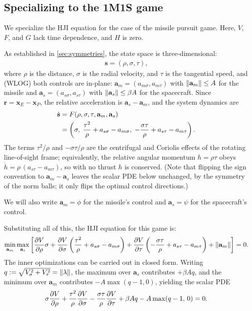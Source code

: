 \documentclass{article}
\newcommand{\eqdef}{:=}
\renewcommand{\vec}[1]{\mathbf{#1}}
\theoremstyle{remark}
\begin{document}
\subsection{Specializing to the 1M1S game}
\label{sec:reduction}

We specialize the HJI equation for the case of the missile pursuit game.
Here, $V$, $F$, and $G$ lack time dependence, and $H$ is zero.

As established in \cref{sec:symmetries}, the state space is three-dimensional:
\begin{align}
\vec{s} = (\rho, \sigma, \tau),
\end{align}
where $\rho$ is the distance, $\sigma$ is the radial velocity, and $\tau$ is the
tangential speed, and (WLOG) both controls are in-plane:
$\vec a_m = (a_{m\sigma}, a_{m\tau})$ with $\norm{\vec a_m} \le A$ for the
missile and $\vec a_s = (a_{s\sigma}, a_{s\tau})$ with
$\norm{\vec a_s} \le \beta A$ for the spacecraft.  Since $\vec r = \vec x_E -
\vec x_P$, the relative acceleration is $\vec a_s - \vec a_m$, and the system
dynamics are
\begin{align}
\dot{\vec{s}}
&= F(\rho, \sigma, \tau, \vec{a}_m, \vec{a}_s) \notag \\
&= \left(\sigma,\;
  \frac{\tau^2}{\rho} + a_{s\sigma} - a_{m\sigma},\;
  -\frac{\sigma\tau}{\rho} + a_{s\tau} - a_{m\tau}\right).
\end{align}
The terms $\tau^2/\rho$ and $-\sigma\tau/\rho$ are the centrifugal and
Coriolis effects of the rotating line-of-sight frame; equivalently, the
relative angular momentum $h = \rho\tau$ obeys
$\dot h = \rho\,(a_{s\tau} - a_{m\tau})$, so with no thrust $h$ is conserved.
(Note that flipping the sign convention to $\vec a_m - \vec a_s$ leaves the
scalar PDE below unchanged, by the symmetry of the norm balls; it only flips
the optimal control directions.)

We will also write $\vec{a}_m = \phi$ for the missile's control and $\vec{a}_s =
\psi$ for the spacecraft's control.

Substituting all of this, the HJI equation for this game is:
\begin{align}
\min_{\vec{a}_m} \max_{\vec{a}_s} \left[
  \pdv{V}{\rho} \sigma
+ \pdv{V}{\sigma} \left(\frac{\tau^2}{\rho} + a_{s\sigma} - a_{m\sigma}\right)
+ \pdv{V}{\tau} \left(-\frac{\sigma\tau}{\rho} + a_{s\tau} - a_{m\tau}\right)
+ \norm{\vec{a}_m}
\right] = 0 .
\end{align}
The inner optimizations can be carried out in closed form.  Writing
$q \eqdef \sqrt{V_\sigma^2 + V_\tau^2} = \norm{\vec \lambda}$, the maximum
over $\vec a_s$ contributes $+\beta A q$, and the minimum over $\vec a_m$
contributes $-A \max(q - 1, 0)$, yielding the scalar PDE
\begin{equation}
  \label{eq:hji-reduced}
  \sigma \pdv{V}{\rho}
  + \frac{\tau^2}{\rho} \pdv{V}{\sigma}
  - \frac{\sigma\tau}{\rho} \pdv{V}{\tau}
  + \beta A q - A \max(q - 1,\, 0) = 0 .
\end{equation}
\end{document}
